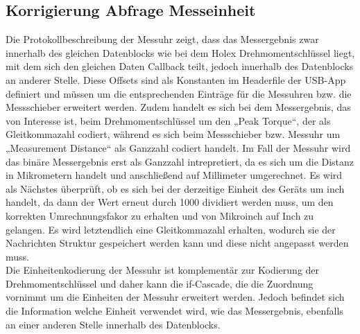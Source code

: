 \subsection{Korrigierung Abfrage Messeinheit}
Die Protokollbeschreibung der Messuhr zeigt, dass das Messergebnis zwar innerhalb des gleichen Datenblocks wie bei dem Holex Drehmomentschlüssel liegt, mit dem sich den gleichen Daten Callback teilt, jedoch innerhalb des Datenblocks an anderer Stelle. Diese Offsets sind als Konstanten im Headerfile der USB-App definiert und müssen um die entsprechenden Einträge für die Messuhren bzw. die Messschieber erweitert werden. Zudem handelt es sich bei dem Messergebnis, das von Interesse ist, beim Drehmomentschlüssel um den „Peak Torque“, der als Gleitkommazahl codiert, während es sich beim Messschieber bzw. Messuhr um „Measurement Distance“ als Ganzzahl codiert handelt. Im Fall der Messuhr wird das binäre Messergebnis erst als Ganzzahl intrepretiert, da es sich um die Distanz in Mikrometern handelt und anschließend auf Millimeter umgerechnet. Es wird als Nächstes überprüft, ob es sich bei der derzeitige Einheit des Geräts um inch handelt, da dann der Wert erneut durch 1000 dividiert werden muss, um den korrekten Umrechnungsfakor zu erhalten und von Mikroinch auf Inch zu gelangen. Es wird letztendlich eine Gleitkommazahl erhalten, wodurch sie der Nachrichten Struktur gespeichert werden kann und diese nicht angepasst werden muss.\\
Die Einheitenkodierung der Messuhr ist komplementär zur Kodierung der Drehmomentschlüssel und daher kann die if-Cascade, die die Zuordnung vornimmt um die Einheiten der Messuhr erweitert werden. Jedoch befindet sich die Information welche Einheit verwendet wird, wie das Messergebnis, ebenfalls an einer anderen Stelle innerhalb des Datenblocks.


